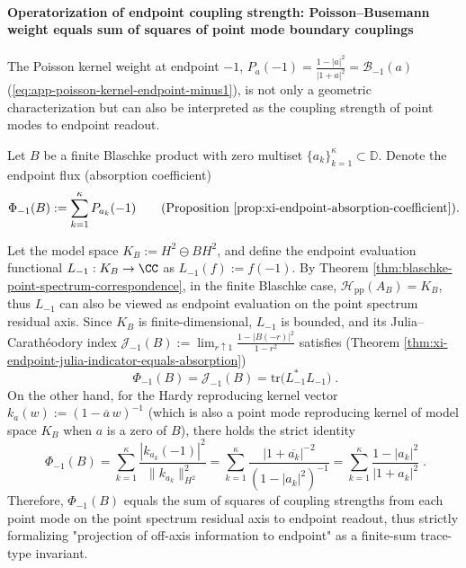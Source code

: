 \paragraph{Operatorization of endpoint coupling strength: Poisson--Busemann weight equals sum of squares of point mode boundary couplings}
The Poisson kernel weight at endpoint \(-1\), \(P_a(-1)=\frac{1-|a|^2}{|1+a|^2}=\mathcal{B}_{-1}(a)\) (\eqref{eq:app-poisson-kernel-endpoint-minus1}), is not only a geometric characterization but can also be interpreted as the coupling strength of point modes to endpoint readout.

\begin{theorem}\label{thm:xi-endpoint-flux-pointmode-coupling}
Let \(B\) be a finite Blaschke product with zero multiset \(\{a_k\}_{k=1}^{\kappa}\subset\mathbb{D}\).
Denote the endpoint flux (absorption coefficient)
\[
\Phi_{-1}(B):=\sum_{k=1}^{\kappa}P_{a_k}(-1)
\qquad\text{(Proposition \ref{prop:xi-endpoint-absorption-coefficient})}.
\]
\par
Let the model space \(K_B:=H^2\ominus BH^2\), and define the endpoint evaluation functional \(L_{-1}:K_B\to\CC\) as \(L_{-1}(f):=f(-1)\).
By Theorem \ref{thm:blaschke-point-spectrum-correspondence}, in the finite Blaschke case, \(\mathcal{H}_{\mathrm{pp}}(A_B)=K_B\), thus \(L_{-1}\) can also be viewed as endpoint evaluation on the point spectrum residual axis.
Since \(K_B\) is finite-dimensional, \(L_{-1}\) is bounded, and its Julia--Carathéodory index
\(
\mathcal{J}_{-1}(B):=\lim_{r\uparrow 1}\frac{1-|B(-r)|^2}{1-r^2}
\)
satisfies (Theorem \ref{thm:xi-endpoint-julia-indicator-equals-absorption})
\[
\boxed{\;
\Phi_{-1}(B)=\mathcal{J}_{-1}(B)=\mathrm{tr}\!\bigl(L_{-1}^\ast L_{-1}\bigr)\; }.
\]
On the other hand, for the Hardy reproducing kernel vector \(k_{a}(w):=(1-\overline a\,w)^{-1}\) (which is also a point mode reproducing kernel of model space \(K_B\) when \(a\) is a zero of \(B\)), there holds the strict identity
\[
\boxed{\;
\Phi_{-1}(B)
=\sum_{k=1}^{\kappa}\frac{|k_{a_k}(-1)|^2}{\|k_{a_k}\|_{H^2}^{2}}
=\sum_{k=1}^{\kappa}\frac{|1+\overline{a_k}|^{-2}}{(1-|a_k|^2)^{-1}}
=\sum_{k=1}^{\kappa}\frac{1-|a_k|^2}{|1+a_k|^2}\; }.
\]
Therefore, \(\Phi_{-1}(B)\) equals the sum of squares of coupling strengths from each point mode on the point spectrum residual axis to endpoint readout, thus strictly formalizing "projection of off-axis information to endpoint" as a finite-sum trace-type invariant.
\end{theorem}

